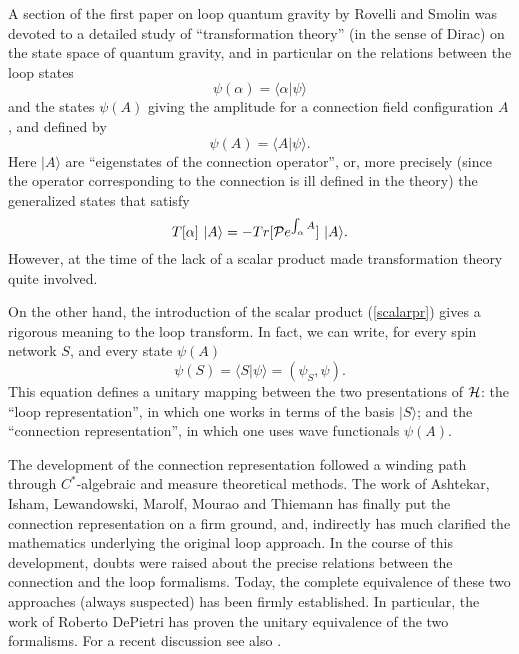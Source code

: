 A section of the first paper on loop quantum gravity by Rovelli 
and Smolin \cite{RovelliSmolin90} was devoted to a detailed 
study of ``transformation theory'' (in the sense of Dirac) on the 
state space of quantum gravity, and in particular on the 
relations between the loop states
\begin{equation}
           \psi(\alpha)=\langle\alpha|\psi\rangle
\end{equation}
and the states $\psi(A)$ giving the amplitude for a connection field 
configuration $A$, and defined by
\begin{equation}
           \psi(A)=\langle A|\psi\rangle. 
\end{equation}
Here $|A\rangle$ are ``eigenstates of the connection operator'', 
or, more precisely (since the operator corresponding to the 
connection is ill defined in the theory) the generalized states 
that satisfy
\begin{equation}
    T[\alpha]\ |A\rangle= - Tr[{\cal P}e^{\int_{\alpha}A}]\ |A\rangle. 
\end{equation}
However, at the time of \cite{RovelliSmolin90} the lack of a scalar 
product made transformation theory quite involved. 

On the other hand, the introduction of the scalar product 
(\ref{scalarpr}) gives a rigorous meaning to the loop 
transform.  In fact, we can 
write, for every spin network $S$, and every state $\psi(A)$
  \begin{equation}
	\psi(S)=\langle S|\psi\rangle=
	(\psi_{S},\psi). 
  \end{equation}
This equation defines a unitary mapping between the two 
presentations of $\cal H$: the ``loop representation'', in 
which one works in terms of the basis $|S\rangle$; and the 
``connection representation'', in which one uses wave 
functionals $\psi(A)$.

The development of the connection representation followed a 
winding path through $C^{*}$-algebraic \cite{AshtekarIsham} and 
measure theoretical 
\cite{AshtekarLewandowski,AshtekarLewandowski2,%
AshtekarLewandowski3} methods.  The work of 
Ashtekar, Isham, Lewandowski, Marolf, Mourao and Thiemann has 
finally put the connection representation on a firm ground, and, 
indirectly has much clarified the mathematics underlying the 
original loop approach.  In the course of this development, doubts 
were raised about the precise relations between the connection and 
the loop formalisms.  Today, the complete equivalence of these two 
approaches (always suspected) has been firmly established.  In 
particular, the work of Roberto DePietri \cite{DePietri} has 
proven the unitary equivalence of the two formalisms.  For a 
recent discussion see also \cite{Lewandowski97}.

